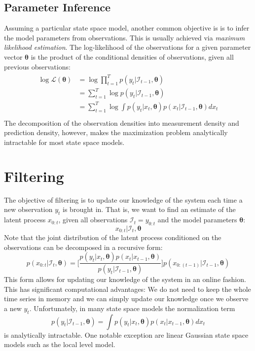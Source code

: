 \documentclass[11pt, oneside]{scrreprt}   	%
\begin{document}
\section{Parameter Inference}
Assuming a particular state space model, another common objective is is to infer the model parameters from observations. This is usually achieved via \textit{maximum likelihood estimation}. The log-likelihood of the observations for a given parameter vector $\boldsymbol{\theta}$ is the product of the conditional densities of observations, given all previous observations:
\begin{align*} 
\begin{split}
\log \mathcal{L}(\boldsymbol{\theta}) &= \log \prod_{t=1}^T p(y_t | \mathcal{I}_{t-1}, \boldsymbol{\theta})\\
&= \sum_{t=1}^T \log  p(y_t | \mathcal{I}_{t-1}, \boldsymbol{\theta})\\
&= \sum_{t=1}^T \log  \int p(y_t | x_{t}, \boldsymbol{\theta}) p(x_{t} | \mathcal{I}_{t-1}, \boldsymbol{\theta}) d x_t\\
\end{split}					
\end{align*} 
The decomposition of the observation densities into measurement density and prediction density, however, makes the maximization problem analytically intractable for most state space models.



\chapter{Filtering}
\label{chp:filtering}
The objective of filtering is to update our knowledge of the system each time a new observation $y_t$ is brought in. That is, we want to find an estimate of the latent process $x_{0:t}$, given all observations $\mathcal{I}_t = y_{0:t}$ and the model parameters $\boldsymbol{\theta}$:
$$
x_{0:t} | \mathcal{I}_t, \boldsymbol{\theta}
$$
Note that the joint distribution of the latent process conditioned on the observations can be decomposed in a recursive form:
$$
p(x_{0:t} | \mathcal{I}_t,\boldsymbol{\theta}) = \Big[ \frac{p(y_t | x_t,\boldsymbol{\theta}) p(x_t | x_{t-1},\boldsymbol{\theta})}{p(y_t | \mathcal{I}_{t-1},\boldsymbol{\theta})} \Big] p(x_{0:(t-1)} | \mathcal{I}_{t-1},\boldsymbol{\theta}) 
$$
This form allows for updating our knowledge of the system in an online fashion. This has significant computational advantages: We do not need to keep the whole time series in memory and we can simply update our knowledge once we observe a new $y_t$. Unfortunately, in many state space models the normalization term 
$$
p(y_t | \mathcal{I}_{t-1},\boldsymbol{\theta}) = \int p(y_t | x_t,\boldsymbol{\theta}) p(x_t | x_{t-1}, \boldsymbol{\theta}) d x_t
$$ 
is analytically intractable. One notable exception are linear Gaussian state space models such as the local level model.
\end{document}

